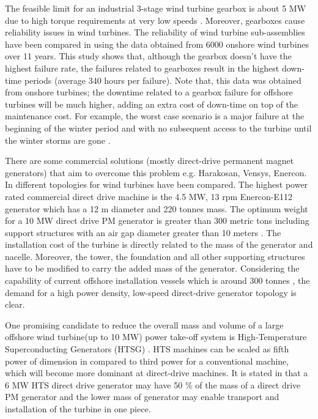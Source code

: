 \documentclass[12pt]{iopart}
\begin{document}
The feasible limit for an industrial 3-stage wind turbine gearbox is about 5 MW due to high torque requirements at very low speeds \cite{Lesser2009}. Moreover, gearboxes cause reliability issues in wind turbines. The reliability of wind turbine sub-assemblies have been compared in \cite{Spinato2009} using the data obtained from 6000 onshore wind turbines over 11 years. This study shows that, although the gearbox doesn't have the highest failure rate, the failures related to gearboxes result in the highest down-time periods (average 340 hours per failure). Note that, this data was obtained from onshore turbines; the downtime related to a gearbox failure for offshore turbines will be much higher, adding an extra cost of down-time on top of the maintenance cost. For example, the worst case scenario is a major failure at the beginning of the winter period and with no subsequent access to the turbine until the winter storms are gone \cite{Abrahamsen2010}.

There are some commercial solutions (mostly direct-drive permanent magnet generators) that aim to overcome this problem e.g. Harakosan, Vensys, Enercon. In \cite{Bang2008} different topologies for wind turbines have been compared. The highest power rated  commercial direct drive machine is the 4.5 MW, 13 rpm Enercon-E112 generator which has a 12 m diameter and 220 tonnes mass. The optimum weight for a 10 MW direct drive PM generator is greater than 300 metric tons including support structures with an air gap diameter greater than 10 meters \cite{Bang2008}. The installation cost of the turbine is directly related to the mass of the generator and nacelle. Moreover, the tower, the foundation and all other supporting structures have to be modified to carry the added mass of the generator. Considering the capability of current offshore installation vessels which is around 300 tonnes \cite{Lewis2007}, the demand for a high power density, low-speed direct-drive generator topology is clear.

One promising candidate to reduce the overall mass and volume of a large offshore wind turbine(up to 10 MW) power take-off system is High-Temperature Superconducting Generators (HTSG) \cite{Lesser2009, Lewis2007, Kalsi2004}. HTS machines can be scaled as fifth power of dimension in \cite{Kalsi2004} compared to third power for a conventional machine, which will become more dominant at direct-drive machines. It is stated in \cite{Lewis2007} that a 6 MW HTS direct drive generator may have 50 \% of the mass of a direct drive PM generator and the lower mass of generator may enable transport and installation of the turbine in one piece.
\end{document}
